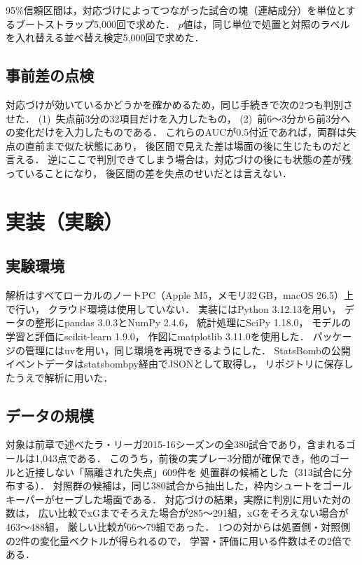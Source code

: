 \documentclass[11pt]{ujarticle} %
\begin{document}
95\%信頼区間は，対応づけによってつながった試合の塊（連結成分）を単位とするブートストラップ5,000回で求めた．
$p$値は，同じ単位で処置と対照のラベルを入れ替える並べ替え検定5,000回で求めた．

\subsection{事前差の点検}

対応づけが効いているかどうかを確かめるため，同じ手続きで次の2つも判別させた．
(1)~失点前3分の32項目だけを入力したもの，
(2)~前6〜3分から前3分への変化だけを入力したものである．
これらのAUCが0.5付近であれば，両群は失点の直前まで似た状態にあり，
後区間で見えた差は場面の後に生じたものだと言える．
逆にここで判別できてしまう場合は，対応づけの後にも状態の差が残っていることになり，
後区間の差を失点のせいだとは言えない．


\section{実装（実験）}
\label{sec:impl}

\subsection{実験環境}

解析はすべてローカルのノートPC（Apple M5，メモリ32\,GB，macOS 26.5）上で行い，
クラウド環境は使用していない．
実装にはPython 3.12.13を用い，
データの整形にpandas 3.0.3\cite{ref:pandas}とNumPy 2.4.6\cite{ref:numpy}，
統計処理にSciPy 1.18.0\cite{ref:scipy}，
モデルの学習と評価にscikit-learn 1.9.0\cite{ref:sklearn}，
作図にmatplotlib 3.11.0\cite{ref:matplotlib}を使用した．
パッケージの管理にはuv\cite{ref:uv}を用い，同じ環境を再現できるようにした．
StatsBombの公開イベントデータ\cite{ref:statsbomb}はstatsbombpy\cite{ref:statsbombpy}経由でJSONとして取得し，
リポジトリに保存したうえで解析に用いた．

\subsection{データの規模}

対象は前章で述べたラ・リーガ2015-16シーズンの全380試合であり，含まれるゴールは1,043点である．
このうち，前後の実プレー3分間が確保でき，他のゴールと近接しない「隔離された失点」609件を
処置群の候補とした（313試合に分布する）．
対照群の候補は，同じ380試合から抽出した，枠内シュートをゴールキーパーがセーブした場面である．
対応づけの結果，実際に判別に用いた対の数は，
広い比較でxGまでそろえた場合が285〜291組，xGをそろえない場合が463〜488組，
厳しい比較が66〜79組であった．
1つの対からは処置側・対照側の2件の変化量ベクトルが得られるので，
学習・評価に用いる件数はその2倍である．
\end{document}
